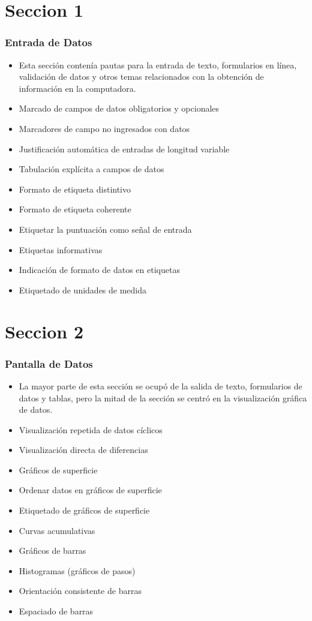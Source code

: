 \documentclass[11pt]{beamer}
\begin{document}
\section{Seccion 1}
\begin{frame}
\frametitle{Entrada de Datos}
\begin{itemize}
\item Esta sección contenía pautas para la entrada de texto, formularios en línea, validación de datos y otros temas relacionados con la obtención de información en la computadora.
\item Marcado de campos de datos obligatorios y opcionales
\item Marcadores de campo no ingresados con datos
\item Justificación automática de entradas de longitud variable
\item Tabulación explícita a campos de datos
\item Formato de etiqueta distintivo
\item Formato de etiqueta coherente
\item Etiquetar la puntuación como señal de entrada
\item Etiquetas informativas
\item Indicación de formato de datos en etiquetas
\item Etiquetado de unidades de medida
\end{itemize}
\end{frame}

\section{Seccion 2}
\begin{frame}
\frametitle{Pantalla de Datos}
\begin{itemize}
\item La mayor parte de esta sección se ocupó de la salida de texto, formularios de datos y tablas, pero la mitad de la sección se centró en la visualización gráfica de datos.
\item Visualización repetida de datos cíclicos
\item Visualización directa de diferencias
\item Gráficos de superficie
\item Ordenar datos en gráficos de superficie
\item Etiquetado de gráficos de superficie
\item Curvas acumulativas
\item Gráficos de barras
\item Histogramas (gráficos de pasos)
\item Orientación consistente de barras
\item Espaciado de barras
\end{itemize}
\end{frame}
\end{document}
